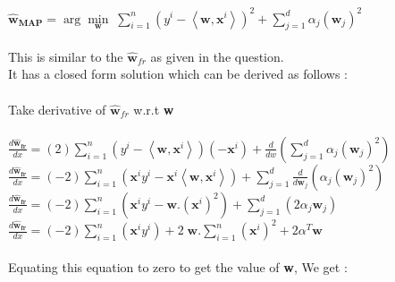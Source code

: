 \documentclass[a4paper,11pt]{article}
\begin{document}
\begin{mlsolution}
\begin{math}
\widehat{\textbf{w}}_{\textbf{MAP}}  = \arg \underset{\textbf{w}}{\min} \; \sum_{i = 1}^{n} \left ( y^{i} - \left \langle \textbf{w}, \textbf{x}^{i} \right \rangle \right )^{2} + \sum_{j = 1}^{d} \alpha_{j}\left ( \textbf{w}_{j} \right )^{2}
\end{math}\\\\This is similar to the \begin{math}\widehat{\textbf{w}}_{fr}\end{math} as given in the question.\\It has a closed form solution which can be derived as follows : \\\\Take derivative of \begin{math}\widehat{\textbf{w}}_{fr}\end{math} w.r.t \textbf{w}\\\\

\begin{math}
\frac{ d\widehat{\textbf{w}}_{\textbf{fr}} }{dx} = \left ( 2 \right ) \sum_{i = 1}^{n}\left ( y^{i} - \left \langle \textbf{w}, \textbf{x}^{i} \right \rangle \right )\left ( - \textbf{x}^{i} \right ) + \frac{d}{dw} (\sum_{j = 1}^{d} \alpha_{j}\left ( \textbf{w}_{j} \right )^{2})
\end{math}\\

\begin{math}
\frac{ d\widehat{\textbf{w}}_{\textbf{fr}} }{dx} = \left ( -2 \right ) \sum_{i = 1}^{n}\left ( \textbf{x}^{i}y^{i} - \textbf{x}^{i}\left \langle \textbf{w}, \textbf{x}^{i} \right \rangle \right  ) + \sum_{j = 1}^{d} \frac{d}{d\textbf{w}_{j}} (\alpha_{j}\left ( \textbf{w}_{j} \right )^{2})
\end{math}\\

\begin{math}
\frac{ d\widehat{\textbf{w}}_{\textbf{fr}} }{dx} = \left ( -2 \right ) \sum_{i = 1}^{n}\left ( \textbf{x}^{i}y^{i} - \textbf{w}. (\textbf{x}^{i})^{2} \right  ) + \sum_{j = 1}^{d} (2\alpha_{j}\textbf{w}_{j})
\end{math}\\

\begin{math}
\frac{ d\widehat{\textbf{w}}_{\textbf{fr}} }{dx} = \left ( -2 \right ) \sum_{i = 1}^{n}\left ( \textbf{x}^{i}y^{i} \right  )  + 2 \; \textbf{w}.\sum_{i=1}^{n} (\textbf{x}^{i})^{2} + 2 \alpha^{T}\textbf{w}
\end{math}\\\\ Equating this equation to zero to get the value of \textbf{w}, We get :\\


\end{mlsolution}
\end{document}
